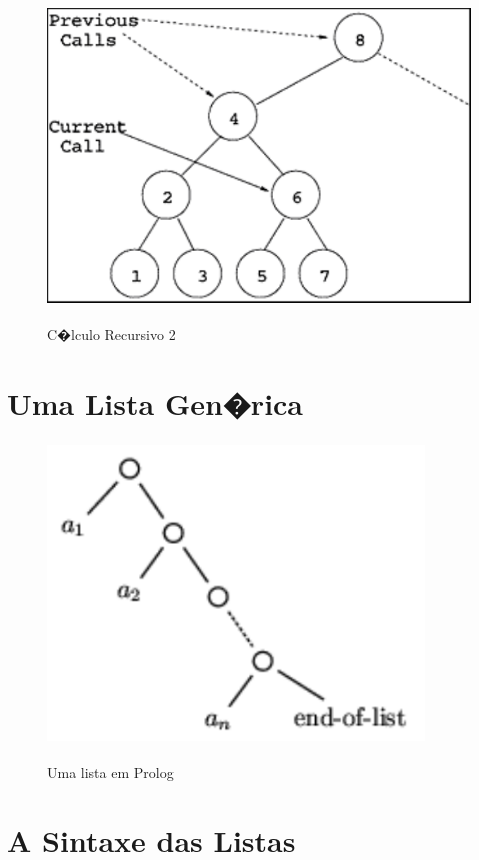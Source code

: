 \documentclass[final,a4paper]{article}
\begin{document}
\begin{figure}[!htb]
\centering
\includegraphics[height=8cm, width=12cm]{figuras/arvore_recursiva_2.pdf}
\label{fig_arv_recurs_2}
\caption{C�lculo Recursivo 2}
\end{figure}

\section{Uma Lista Gen�rica}

\begin{figure}[!htb]
\centering
\includegraphics[height=8cm, width=10cm]{figuras/listas_0.pdf}
\label{fig_listas_0}
\caption{Uma lista em Prolog}
\end{figure}


\section{A Sintaxe das Listas}
\end{document}
